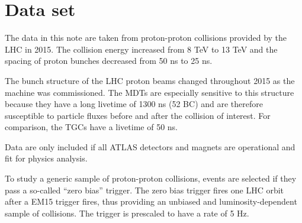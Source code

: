 \section{Data set}
\label{sec:data}

The data in this note are taken from proton-proton collisions provided by the LHC in 2015. The collision energy increased from 8 TeV to 13 TeV and the spacing of proton bunches decreased from 50 ns to 25 ns. 

The bunch structure of the LHC proton beams changed throughout 2015 as the machine was commissioned. The MDTs are especially sensitive to this structure because they have a long livetime of 1300 ns (52 BC) and are therefore susceptible to particle fluxes before and after the collision of interest. For comparison, the TGCs have a livetime of 50 ns.

Data are only included if all ATLAS detectors and magnets are operational and fit for physics analysis.

To study a generic sample of proton-proton collisions, events are selected if they pass a so-called ``zero bias'' trigger. The zero bias trigger fires one LHC orbit after a EM15 trigger fires, thus providing an unbiased and luminosity-dependent sample of collisions. The trigger is prescaled to have a rate of 5 Hz. 


